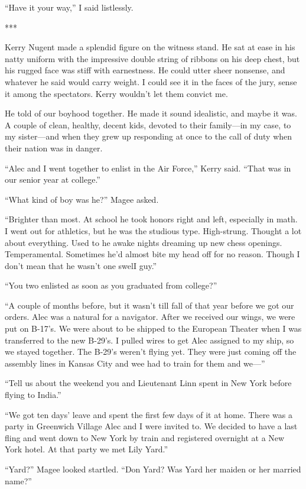 \documentclass{novel}
\begin{document}
{“Have it your way,” I said listlessly.

***

Kerry Nugent made a splendid figure on the witness stand. He sat at ease in his natty uniform with the impressive double string of ribbons on his deep chest, but his rugged face was stiff with earnestness. He could utter sheer nonsense, and whatever he said would carry weight. I could see it in the faces of the jury, sense it among the spectators. Kerry wouldn’t let them convict me.

He told of our boyhood together. He made it sound idealistic, and maybe it was. A couple of clean, healthy, decent kids, devoted to their family—in my case, to my sister—and when they grew up responding at once to the call of duty when their nation was in danger.

“Alec and I went together to enlist in the Air Force,” Kerry said. “That was in our senior year at college.”

“What kind of boy was he?” Magee asked.

“Brighter than most. At school he took honors right and left, especially in math. I went out for athletics, but he was the studious type. High-strung. Thought a lot about everything. Used to he awake nights dreaming up new chess openings. Temperamental. Sometimes he’d almost bite my head off for no reason. Though I don’t mean that he wasn’t one swelI guy.”

“You two enlisted as soon as you graduated from college?”

“A couple of months before, but it wasn’t till fall of that year before we got our orders. Alec was a natural for a navigator. After we received our wings, we were put on B-17’s. We were about to be shipped to the European Theater when I was transferred to the new B-29’s. I pulled wires to get Alec assigned to my ship, so we stayed together. The B-29’s weren’t flying yet. They were just coming off the assembly lines in Kansas City and wee had to train for them and we—”

“Tell us about the weekend you and Lieutenant Linn spent in New York before flying to India.”

“We got ten days’ leave and spent the first few days of it at home. There was a party in Greenwich Village Alec and I were invited to. We decided to have a last fling and went down to New York by train and registered overnight at a New York hotel. At that party we met Lily Yard.”

“Yard?” Magee looked startled. “Don Yard? Was Yard her maiden or her married name?”

}
\end{document}
